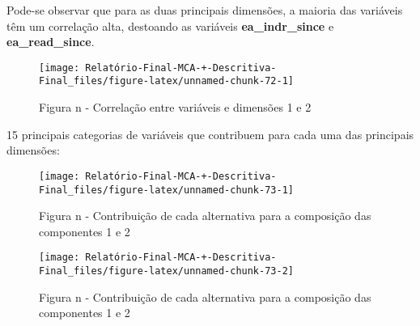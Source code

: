 \documentclass[
]{article}
\begin{document}
Pode-se observar que para as duas principais dimensões, a maioria das
variáveis têm um correlação alta, destoando as variáveis
\textbf{ea\_indr\_since} e \textbf{ea\_read\_since}.

\begin{figure}

{\centering \texttt{[image: Relatório-Final-MCA-+-Descritiva-Final\_files/figure-latex/unnamed-chunk-72-1]} 

}

\caption{Figura n - Correlação entre variáveis e dimensões 1 e 2}\label{fig:unnamed-chunk-72}
\end{figure}

15 principais categorias de variáveis que contribuem para cada uma das
principais dimensões:

\begin{figure}

{\centering \texttt{[image: Relatório-Final-MCA-+-Descritiva-Final\_files/figure-latex/unnamed-chunk-73-1]} 

}

\caption{Figura n - Contribuição de cada alternativa para a composição das componentes 1 e 2}\label{fig:unnamed-chunk-73-1}
\end{figure}
\begin{figure}

{\centering \texttt{[image: Relatório-Final-MCA-+-Descritiva-Final\_files/figure-latex/unnamed-chunk-73-2]} 

}

\caption{Figura n - Contribuição de cada alternativa para a composição das componentes 1 e 2}\label{fig:unnamed-chunk-73-2}
\end{figure}
\end{document}
